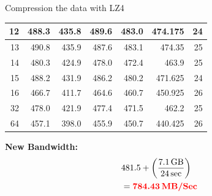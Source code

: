 \documentclass[aspectratio=169]{beamer}
\begin{document}
\begin{frame}{Compression the data with LZ4}
\begin{minipage}{0.5\textwidth}
\begin{table}[htbp]
{\begin{tabular}{|r|r|r|r|r|r|r|}
                \hline
                12&488.3 & 435.8 & 489.6 & 483.0 & 474.175 & 24 \\
                \hline
                13&490.8 & 435.9 & 487.6 & 483.1 & 474.35  & 25 \\
                \hline
                14&480.3 & 424.9 & 478.0 & 472.4 & 463.9   & 25 \\
                \hline
                15&488.2 & 431.9 & 486.2 & 480.2 & 471.625 & 24 \\
                \hline
                16      & 466.7 & 411.7 & 464.6 & 460.7   & 450.925 & 26 \\
                \hline
                32      & 478.0 & 421.9 & 477.4 & 471.5   & 462.2   & 25 \\
                \hline
                64      & 457.1 & 398.0 & 455.9 & 450.7   & 440.425 & 26 \\
                \hline 
        \end{tabular}
        }
        \end{table}        
        \end{minipage}%
        \hfill  
        \begin{minipage}{0.5\textwidth}
            \textbf{{New Bandwidth:}} 
            \[
            \begin{aligned}
                &481.5 +\left( \frac{7.1 \, \text{GB}}{24 \, \text{sec}} \right) \\
                &= \textbf{\textcolor{red}{784.43\,\text{MB/Sec}}}
            \end{aligned}
            \]
            
        \end{minipage}
        
\end{frame}
\end{document}
